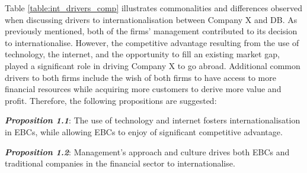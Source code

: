 \documentclass[11pt,a4paper]{article}
\begin{document}
{{{Table \ref{table:int_drivers_comp} illustrates commonalities and differences observed when discussing drivers to internationalisation between Company X and DB. As previously mentioned, both of the firms' management contributed to its decision to internationalise. However, the competitive advantage resulting from the use of technology, the internet, and the opportunity to fill an existing market gap, played a significant role in driving Company X to go abroad. Additional common drivers to both firms include the wish of both firms to have access to more financial  resources while acquiring more customers to derive more value and profit. Therefore, the following propositions are suggested:
\begin{center}
\textbf{\textit{Proposition 1.1}}: The use of technology and internet fosters internationalisation in EBCs, while allowing EBCs to enjoy of significant competitive advantage.
\end{center}
\begin{center}
\textbf{\textit{Proposition 1.2}}: Management's approach and culture drives both EBCs and traditional companies in the financial sector to internationalise.
\end{center}

}}}
\end{document}
